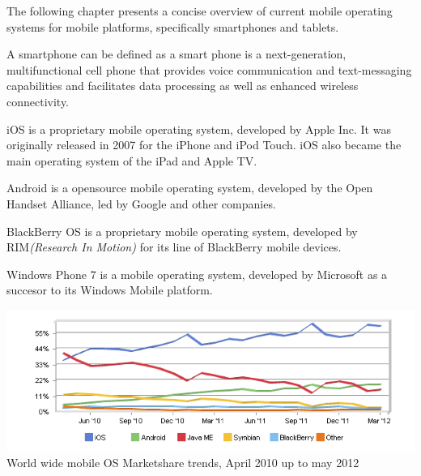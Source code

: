 

The following chapter presents a concise overview of current mobile operating systems for mobile platforms, specifically smartphones and tablets.


A smartphone can be defined as a smart phone is a next-generation, multifunctional cell phone that provides voice communication and text-messaging capabilities and facilitates data processing as well as enhanced wireless connectivity.\cite{Ni2006}

iOS is a proprietary mobile operating system, developed by Apple Inc. It was originally released in 2007 for the iPhone and iPod Touch. iOS also became the main operating system of the iPad and Apple TV.

Android is a opensource mobile operating system, developed by the Open Handset Alliance, led by Google and other companies.\cite{Inc.2012}

BlackBerry OS is a proprietary mobile operating system, developed by RIM\emph{(Research In Motion)} for its line of BlackBerry mobile devices.

Windows Phone 7 is a mobile operating system, developed by Microsoft as a succesor to its Windows Mobile platform.



\begin{centering}
\includegraphics[scale=0.5]{images/marketsharetrendsApril10Tomay12.png}\\{World wide mobile OS Marketshare trends, April 2010 up to may 2012}\\
\end{centering}

